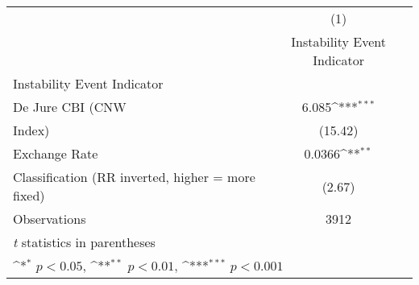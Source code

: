 {
\def\sym#1{\ifmmode^{#1}\else\(^{#1}\)\fi}
\begin{tabular}{l*{1}{c}}
\hline\hline
                    &\multicolumn{1}{c}{(1)}\\
                    &\multicolumn{1}{c}{Instability Event Indicator}\\
\hline
Instability Event Indicator&                     \\
De Jure CBI (CNW    &       6.085\sym{***}\\
Index)              &     (15.42)         \\
[1em]
Exchange Rate       &      0.0366\sym{**} \\
Classification (RR inverted, higher = more fixed)&      (2.67)         \\
\hline
Observations        &        3912         \\
\hline\hline
\multicolumn{2}{l}{\footnotesize \textit{t} statistics in parentheses}\\
\multicolumn{2}{l}{\footnotesize \sym{*} \(p<0.05\), \sym{**} \(p<0.01\), \sym{***} \(p<0.001\)}\\
\end{tabular}
}

